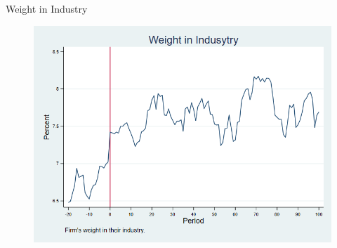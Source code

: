 \documentclass{beamer}
\begin{document}
\begin{frame}{Weight in Industry}
	\begin{figure}
	\centering
	\includegraphics[width=0.65\linewidth]{Output/weight}
	\label{fig:weight}
\end{figure}
\end{frame}
\end{document}
